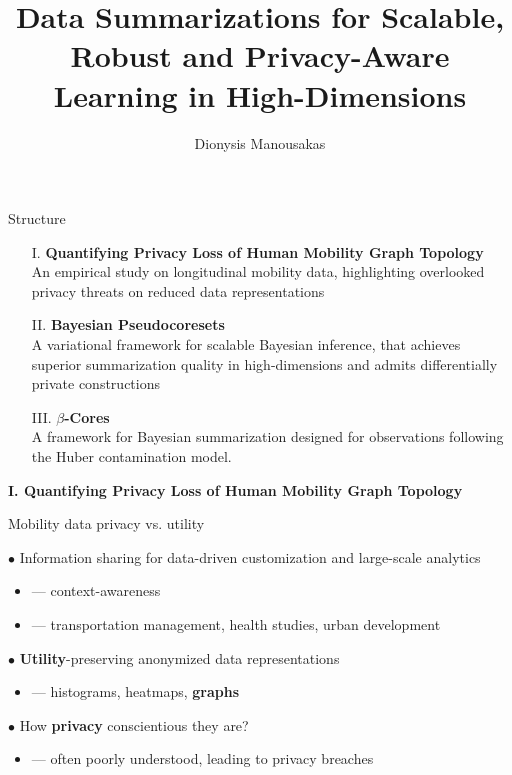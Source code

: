 \documentclass[hyperref={colorlinks = true},unknownkeysallowed]{beamer}
\title{Data Summarizations for Scalable, Robust and Privacy-Aware Learning in High-Dimensions}
\author{Dionysis Manousakas}
\institute{Department of Computer Science \& Technology, \\University of Cambridge}
\date{}
\let\oldcitep=\citep
\renewcommand\citep[1]{\hypersetup{linkcolor=UBCblue}\hyperlink{#1}{\oldcitep{#1}}}
\begin{document}
	
\begin{frame}
\vspace{2cm}
  \titlepage
  \vspace{10cm}
\end{frame}

\begin{frame}{Structure}
	\begin{itemize}
		\item[I.]\textbf{Quantifying Privacy Loss of Human Mobility Graph Topology}  \small{\citep{manousakas2018quantifying}} \\
		An empirical study on longitudinal mobility data, highlighting overlooked privacy threats on reduced data representations
		\item[II.]\textbf{Bayesian Pseudocoresets} \small{\citep{psvi}} \\
		A variational framework for scalable Bayesian inference, that achieves superior summarization quality in high-dimensions and admits differentially private constructions
		\item[III.]\textbf{$\beta$-Cores} \small{\citep{beta-cores}}  \\
		A framework for Bayesian summarization designed for observations following the Huber contamination model.
	\end{itemize}
\end{frame}

\begin{frame}
	\LARGE{\textbf{I. Quantifying Privacy Loss of Human Mobility Graph Topology}}
\end{frame}

\begin{frame}{ Mobility data privacy vs. utility}
	\vspace*{2.25mm}
\begin{block}{ $\bullet$ Information sharing for data-driven customization and large-scale analytics}
	\begin{itemize}
		  \setlength\itemsep{.3em}
		\item --- context-awareness
		\item --- transportation management, health studies, urban development
	\end{itemize}
\end{block}
\begin{block}{ $\bullet$ \textbf{Utility}-preserving anonymized data representations}
	\begin{itemize}
		  \setlength\itemsep{.3em}
	\item --- histograms, heatmaps, \textbf{graphs}
	\end{itemize}
\end{block}
\begin{block}{ $\bullet$ How \textbf{privacy} conscientious they are?}
	\begin{itemize}
		\item --- often poorly understood, leading to privacy breaches
	\end{itemize}
\end{block}
\end{frame}
\end{document}
